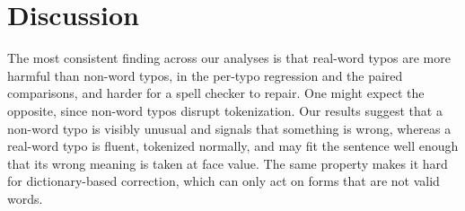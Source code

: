\documentclass[11pt]{article}
\begin{document}
\begin{table}[t]
\centering
\small
{}
\caption{GSM8K answered-only accuracy (\%) under each mitigation, per condition, with the change against the unmodified prompt (\emph{no fix}). The mean row is taken over the nine typo conditions. $\Delta$ is computed from unrounded accuracies, so it can differ by 0.1 from the difference of the values shown.}
\label{tab:3}
\end{table}


\section{Discussion}

The most consistent finding across our analyses is that real-word typos are more harmful than non-word typos, in the per-typo regression and the paired comparisons, and harder for a spell checker to repair. One might expect the opposite, since non-word typos disrupt tokenization. Our results suggest that a non-word typo is visibly unusual and signals that something is wrong, whereas a real-word typo is fluent, tokenized normally, and may fit the sentence well enough that its wrong meaning is taken at face value. The same property makes it hard for dictionary-based correction, which can only act on forms that are not valid words.
\end{document}
